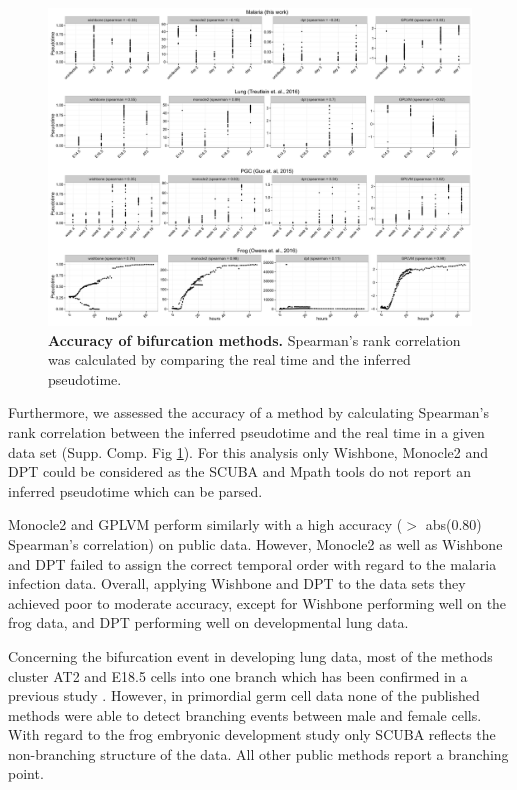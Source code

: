 \begin{figure}
    \centering
    \includegraphics[width=\textwidth]{"realtime_vs_pseudotime_accuracy"}
    \caption[Accuracy of bifurcation methods]{\textbf{Accuracy of bifurcation methods.} Spearman's rank correlation was calculated by comparing the real time and the inferred pseudotime.}
    \label{fig:real_vs_pseudo}
\end{figure}

Furthermore, we assessed the accuracy of a method by calculating Spearman's rank correlation between the inferred pseudotime and the real time in a given data set (Supp. Comp. Fig \ref{fig:real_vs_pseudo}). For this analysis only Wishbone, Monocle2 and DPT could be considered as the SCUBA and Mpath tools do not report an inferred pseudotime which can be parsed.

Monocle2 and GPLVM perform similarly with a high accuracy ($>$ abs(0.80) Spearman's correlation) on public data. However, Monocle2 as well as Wishbone and DPT failed to assign the correct temporal order with regard to the malaria infection data. Overall, applying Wishbone and DPT to the data sets they achieved poor to moderate accuracy, except for Wishbone performing well on the frog data, and DPT performing well on developmental lung data.

Concerning the bifurcation event in developing lung data, most of the methods cluster AT2 and E18.5  cells into one branch which has been confirmed in a previous study \cite{Treutlein2014-rz}. However, in primordial germ cell data none of the published methods were able to detect branching  events between male and female cells. With regard to the frog embryonic development study only SCUBA reflects the non-branching structure of the data. All other public methods report a branching point.

